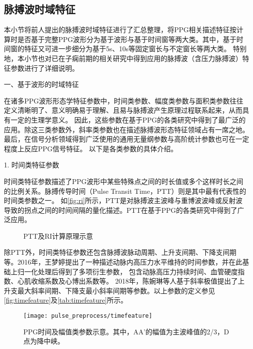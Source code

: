 \subsection{脉搏波时域特征}
本小节将前人提出的脉搏波时域特征进行了汇总整理，将PPG相关描述特征按计算时是否基于完整PPG波形分为基于波形与基于时间窗等两大类。其中，基于时间窗的特征又可进一步细分为基于5s、10s等固定窗长与不定窗长等两大类。
特别地，本小节也对已在子痫前期的相关研究中得到应用的脉搏波（含压力脉搏波）特征参数进行了详细说明。

一、基于波形的时域特征

在诸多PPG波形形态学特征参数中，时间类参数、幅度类参数与面积类参数往往定义清晰明了、意义明确易于理解、且易与脉搏波产生原理过程联系起来，从而具有一定的生理学意义。
因此，这些参数在基于PPG的各类研究中得到了最广泛的应用\cite{cwl,mmt}。除这三类参数外，斜率类参数也在描述脉搏波形态特征领域占有一席之地。
最后，在信号分析领域得到广泛使用的通用无量纲参数与高阶统计参数也可在一定程度上反应PPG信号特征。
以下是各类参数的具体介绍。

1. 时间类特征参数

时间类特征参数描述了PPG波形中某些特殊点之间的时长值或多个这样时长之间的比例关系。脉搏传导时间（Pulse Transit Time，PTT）则是其中最有代表性的时间类参数之一。
如\autoref{fig:ri}所示，PTT是对脉搏波主波峰与重博波波峰或反射波导致的拐点之间的时间间隔的量化描述\cite{Brumfield2005,Su2014}。PTT在基于PPG的各类研究中得到了广泛应用。
\begin{figure}[htbp]
    \centering
    \quad
    \caption[PTT及RI计算原理示意]{\label{fig:ri}PTT及RI计算原理示意\cite{Su2014}}
\end{figure}

除PTT外，时间类特征参数还包含脉搏波脉动周期、上升支间期、下降支间期等。2016年，王梦婷提出了一种描述动脉内高压力水平维持的时间参数，并在此基础上归一化处理后得到了多项衍生参数，
包含动脉高压力持续时间、血管硬度指数、心肌收缩系数及心博出系数等\cite{mmt}。
2018年，陈婉琳等人基于斜率极值提出了上升支最大斜率间期、下降支最小斜率间期等参数\cite{cwl}。以上参数的定义参见\autoref{fig:timefeature}及\autoref{tab:timefeature}所示。
\begin{figure}[htbp]
    \centering
    \texttt{[image: pulse\_preprocess/timefeature]}
    \caption[PPG时间及幅值类参数示意]{\label{fig:timefeature}PPG时间及幅值类参数示意。其中，AA'的幅值为主波峰值的2/3，D点为降中峡。}
\end{figure}

